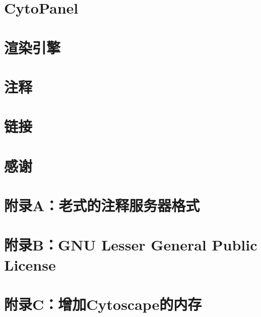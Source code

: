 \documentclass[a4paper, oneside]{book}
\begin{document}
\begin{CJK}{UTF8}{gbsn}
\chapter{CytoPanel}


\chapter{渲染引擎}


\chapter{注释}


\chapter{链接}


\chapter*{感谢}


\chapter*{附录A：老式的注释服务器格式}


\chapter*{附录B：GNU Lesser General Public License}


\chapter*{附录C：增加Cytoscape的内存}


\end{CJK}
\end{document}
